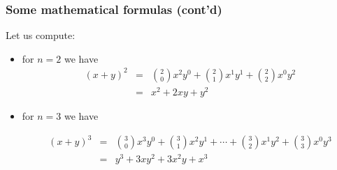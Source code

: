 \documentclass[notes=show,handout]{beamer}\usepackage[]{graphicx}\usepackage[]{color}
\newcommand{\bea}{\begin{eqnarray}}
\newcommand{\eea}{\end{eqnarray}}
\begin{document}
\begin{frame}
\frametitle{Some mathematical formulas (cont'd)}

\begin{example}
Let us compute:
\begin{small}
\begin{itemize}



\item for $n=2$ we have
\bea
(x+y)^2 &=& {2 \choose 0}x^2 y^0 + {2 \choose 1}x^{1}y^1 +  {2 \choose 2}x^0 y^{2} \nonumber \\
  &=&  x^2 +  2 x y +  y^{2} \nonumber
\eea


\item for $n=3$ we have

\begin{small}
\bea
(x+y)^3 &=& {3 \choose 0}x^3 y^0 + {3 \choose 1}x^{2}y^1 + \cdots + {3 \choose 2}x^1 y^{2} + {3 \choose 3}x^0 y^3 \nonumber \\
&=& y^3 + 3xy^2 + 3x^2y+x^3 \nonumber
\eea
\end{small}

\end{itemize}
\end{small}


\end{example}


\end{frame}
\end{document}
